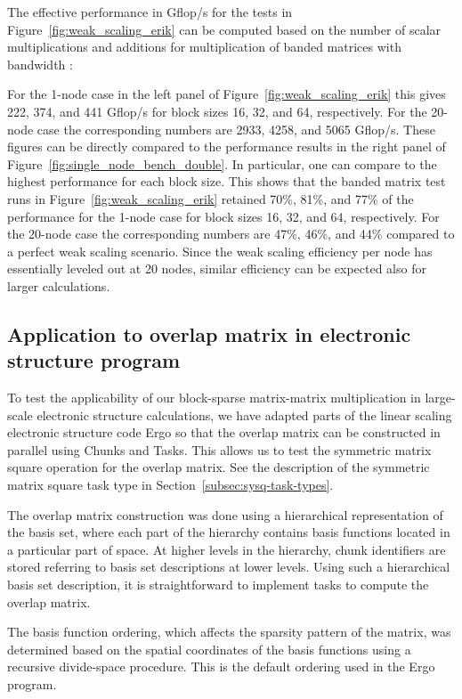 \documentclass{elsarticle}
\begin{document}
The effective performance in Gflop/s for the tests in
Figure~\ref{fig:weak_scaling_erik} can be computed based on the number
of scalar multiplications and additions for multiplication of banded
matrices with bandwidth :

For the 1-node case in the left panel of
Figure~\ref{fig:weak_scaling_erik} this gives 222, 374, and 441
Gflop/s for block sizes 16, 32, and 64, respectively. For the 20-node
case the corresponding numbers are 2933, 4258, and 5065 Gflop/s.
These figures can be directly compared to the performance results in
the right panel of Figure~\ref{fig:single_node_bench_double}. In
particular, one can compare to the highest performance for each block
size.  This shows that the banded matrix test runs in
Figure~\ref{fig:weak_scaling_erik} retained 70\%, 81\%, and 77\% of
the performance for the 1-node case for block sizes 16, 32, and 64,
respectively. For the 20-node case the corresponding numbers are 47\%,
46\%, and 44\% compared to a perfect weak scaling scenario.  Since the
weak scaling efficiency per node has essentially leveled out at 20
nodes, similar efficiency can be expected also for larger
calculations.




\subsection{Application to overlap matrix in electronic structure program}\label{sec:smat-tests}


To test the applicability of our block-sparse matrix-matrix
multiplication in large-scale electronic structure calculations, we
have adapted parts of the linear scaling electronic structure code
{\sc Ergo} \cite{linmemDFT} so that the overlap matrix can be
constructed in parallel using Chunks and Tasks. This allows us to test
the symmetric matrix square operation for the overlap matrix. See the
description of the symmetric matrix square task type in
Section~\ref{subsec:sysq-task-types}.

The overlap matrix construction was done using a hierarchical
representation of the basis set, where each part of the hierarchy
contains basis functions located in a particular part of space. At
higher levels in the hierarchy, chunk identifiers are stored referring to basis set
descriptions at lower levels. Using such a hierarchical basis set
description, it is straightforward to implement tasks to compute the
overlap matrix.

The basis function ordering, which affects the sparsity pattern of the
matrix, was determined based on the spatial coordinates of the basis
functions using a recursive divide-space procedure. This is the
default ordering used in the {\sc Ergo} program.
\end{document}
